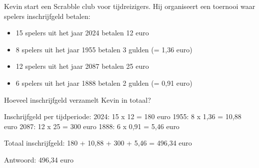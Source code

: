 \begin{opgave}
Kevin start een Scrabble club voor tijdreizigers. Hij organiseert een toernooi 
waar spelers inschrijfgeld betalen:
\begin{itemize}
\item 15 spelers uit het jaar 2024 betalen 12 euro
\item 8 spelers uit het jaar 1955 betalen 3 gulden (= 1,36 euro)  
\item 12 spelers uit het jaar 2087 betalen 25 euro
\item 6 spelers uit het jaar 1888 betalen 2 gulden (= 0,91 euro)
\end{itemize}
Hoeveel inschrijfgeld verzamelt Kevin in totaal?
\end{opgave}

\begin{oplossing}
Inschrijfgeld per tijdperiode:
2024: 15 x 12 = 180 euro
1955: 8 x 1,36 = 10,88 euro
2087: 12 x 25 = 300 euro
1888: 6 x 0,91 = 5,46 euro

Totaal inschrijfgeld:
180 + 10,88 + 300 + 5,46 = 496,34 euro

Antwoord: 496,34 euro
\end{oplossing}